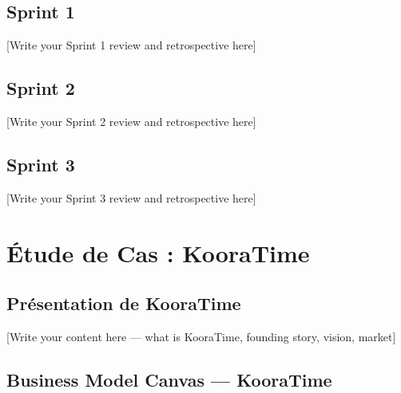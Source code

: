 \subsection{Sprint 1}
\label{sec:sprint-1}


[Write your Sprint 1 review and retrospective here]

\subsection{Sprint 2}
\label{sec:sprint-2}


[Write your Sprint 2 review and retrospective here]

\subsection{Sprint 3}
\label{sec:sprint-3}


[Write your Sprint 3 review and retrospective here]


\section{Étude de Cas : KooraTime}
\label{sec:kooratime}

\subsection{Présentation de KooraTime}
\label{sec:kooratime-presentation}

[Write your content here — what is KooraTime, founding story, vision, market]

\subsection{Business Model Canvas — KooraTime}
\label{sec:kooratime-bmc}

